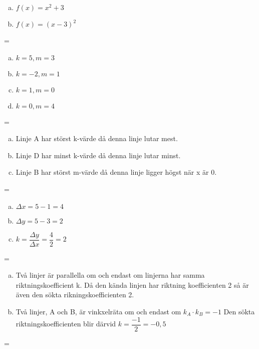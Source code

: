 \documentclass {article}
\newenvironment{absolutelynopagebreak}
  {\par\nobreak\vfil\penalty0\vfilneg
   \vtop\bgroup}
  {\par\xdef\tpd{\the\prevdepth}\egroup
   \prevdepth=\tpd}
\begin{document}
\begin{absolutelynopagebreak}
\begin{enumerate}[a)]
\item $f(x) = x^2 + 3$
\item $f(x) = (x - 3)^2$
\end{enumerate}
\end{absolutelynopagebreak}

\begin{absolutelynopagebreak}
\begin{enumerate}[a)]
\item $k = 5, m = 3$
\item $k = -2, m = 1$
\item $k = 1, m = 0$
\item $k = 0, m = 4$
\end{enumerate}
\end{absolutelynopagebreak}

\begin{absolutelynopagebreak}
\begin{enumerate}[a)]
\item Linje A har störst k-värde då denna linje lutar mest.
\item Linje D har minst k-värde då denna linje lutar minst.
\item Linje B har störst m-värde då denna linje ligger högst när x är 0.
\end{enumerate}
\end{absolutelynopagebreak}

\begin{absolutelynopagebreak}
\begin{enumerate}[a)]
\item $\Delta x = 5 - 1 = 4$
\item $\Delta y = 5 - 3 = 2$
\item $k = \dfrac{\Delta y}{\Delta x} = \dfrac{4}{2} = 2$
\end{enumerate}
\end{absolutelynopagebreak}

\begin{absolutelynopagebreak}
\begin{enumerate}[a)]
\item Två linjer är parallella om och endast om linjerna har samma riktningskoefficient k. Då den kända linjen har riktning koefficienten 2 så 
är även den sökta rikningskoefficienten 2.
\item Två linjer, A och B, är vinkxelräta om och endast om $k_{A} \cdot k_{B} = -1$ Den sökta riktningskoefficienten blir därvid $ k = \dfrac{-1}{2} = -0,5$
\end{enumerate}
\end{absolutelynopagebreak}
\end{document}
